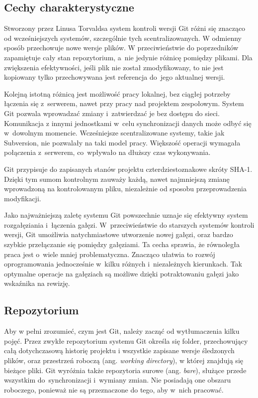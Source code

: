 \documentclass[12pt,a4paper,polish,thesis]{dcsbook}
\begin{document}
	\subsection{Cechy charakterystyczne}
	Stworzony przez Linusa Torvaldsa system kontroli wersji Git różni się znacząco od wcześniejszych systemów, szczególnie tych scentralizowanych. W odmienny sposób przechowuje nowe wersje plików. W przeciwieństwie do poprzedników zapamiętuje cały stan repozytorium, a~nie jedynie różnicę pomiędzy plikami. Dla zwiększenia efektywności, jeśli plik nie został zmodyfikowany, to nie jest kopiowany tylko przechowywana jest referencja do~jego aktualnej wersji.

	Kolejną istotną różnicą jest możliwość pracy lokalnej, bez ciągłej potrzeby łączenia się z~serwerem, nawet przy pracy nad projektem zespołowym. System Git pozwala wprowadzać zmiany i~zatwierdzać je bez dostępu do sieci. Komunikacja z innymi jednostkami w~celu synchronizacji danych może odbyć się w~dowolnym momencie. Wcześniejsze scentralizowane systemy, takie jak Subversion, nie pozwalały na taki model pracy. Większość operacji wymagała połączenia z~serwerem, co~wpływało na dłuższy czas wykonywania.

	Git przypisuje do zapisanych stanów projektu czterdziestoznakowe skróty SHA-1. Dzięki tym sumom kontrolnym zauważy każdą, nawet najmniejszą zmianę wprowadzoną na kontrolowanym pliku, niezależnie od sposobu przeprowadzenia modyfikacji.

	Jako najważniejszą zaletę systemu Git powszechnie uznaje się efektywny system rozgałęziania i~łączenia gałęzi. W~przeciwieństwie do starszych systemów kontroli wersji, Git umożliwia natychmiastowe utworzenie nowej gałęzi, oraz bardzo szybkie przełączanie się pomiędzy gałęziami. Ta cecha sprawia, że równoległa praca jest o~wiele mniej problematyczna. Znacząco ułatwia to rozwój oprogramowania jednocześnie w~kilku różnych i~niezależnych kierunkach. Tak optymalne operacje na gałęziach są możliwe dzięki potraktowaniu gałęzi jako wskaźnika na rewizję.

	\subsection{Repozytorium}

	Aby w pełni zrozumieć, czym jest Git, należy zacząć od wytłumaczenia kilku pojęć. Przez zwykłe repozytorium systemu Git określa się folder, przechowujący całą dotychczasową historię projektu i wszystkie zapisane wersje śledzonych plików, oraz przestrzeń roboczą (ang. \textit{working directory}), w której znajdują się bieżące pliki. Git wyróżnia także repozytoria surowe (ang. \textit{bare}), służące przede wszystkim do~synchronizacji i~wymiany zmian. Nie posiadają one obszaru roboczego, ponieważ nie są przeznaczone do tego, aby w~nich pracować.
\end{document}
